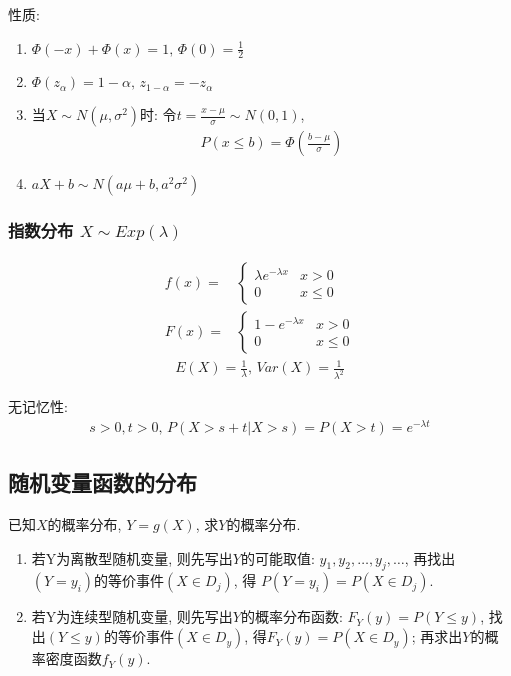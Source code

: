 性质: 
\begin{enumerate}
    \item $\Phi(-x)+\Phi(x)=1,\,\Phi(0)=\frac{1}{2}$
    \item $\Phi(z_{\alpha})=1-\alpha, \, z_{1-\alpha}=-z_{\alpha}$
    \item 当$X\sim N(\mu,\sigma^2)$时: 令$t=\frac{x-\mu}{\sigma} \sim N(0,1)$, 
    \begin{align*}
        P(x\le b)=\Phi(\frac{b-\mu}{\sigma})
    \end{align*}
    \item $aX+b \sim N(a\mu+b, a^2\sigma^2)$
\end{enumerate}

\subsubsection{指数分布 \texorpdfstring{$X\sim Exp(\lambda)$}.}
\begin{align*}
    f(x)=&\left\{ \begin{array}{lc}
        \lambda e^{-\lambda x} & x>0 \\ 0 & x\le 0
    \end{array} \right.\\
    F(x)=&\left\{\begin{array}{lc}
        1-e^{-\lambda x} & x>0 \\ 0 & x\le 0
    \end{array} \right. 
\end{align*}
\begin{align*}
    E(X)=\frac{1}{\lambda},\, Var(X)=\frac{1}{\lambda^2}
\end{align*}

无记忆性: 
\begin{align*}
    s>0,t>0,\, P(X>s+t|X>s)=P(X>t)=e^{-\lambda t}
\end{align*}

\subsection{随机变量函数的分布}
已知$X$的概率分布, $Y=g(X)$, 求$Y$的概率分布. 
\begin{enumerate}
    \item 若Y为离散型随机变量, 则先写出$Y$的可能取值: $y_1,y_2,\dots,y_j,\dots$, 再找出$(Y=y_i)$的等价事件$(X\in D_j)$, 得 $P(Y=y_i)=P(X\in D_j)$. 
    \item 若Y为连续型随机变量, 则先写出$Y$的概率分布函数: $F_Y(y)=P(Y\le y)$, 找出$(Y\le y)$的等价事件$(X\in D_y)$, 得$F_Y(y)=P(X\in D_y)$; 再求出$Y$的概率密度函数$f_Y(y)$.
\end{enumerate}

